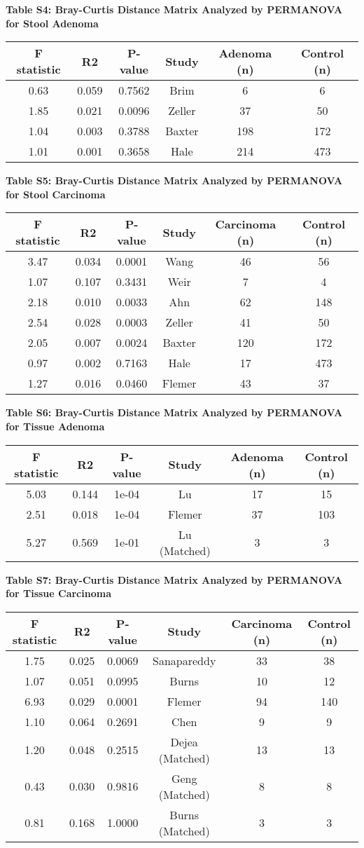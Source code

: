 \documentclass[12pt,]{article}
\begin{document}
\newpage

\textbf{Table S4: Bray-Curtis Distance Matrix Analyzed by PERMANOVA for
Stool Adenoma}

\begin{longtable}[]{@{}cccccc@{}}
\toprule
F statistic & R2 & P-value & Study & Adenoma (n) & Control
(n)\tabularnewline
\midrule
\endhead
0.63 & 0.059 & 0.7562 & Brim & 6 & 6\tabularnewline
1.85 & 0.021 & 0.0096 & Zeller & 37 & 50\tabularnewline
1.04 & 0.003 & 0.3788 & Baxter & 198 & 172\tabularnewline
1.01 & 0.001 & 0.3658 & Hale & 214 & 473\tabularnewline
\bottomrule
\end{longtable}

\newpage

\textbf{Table S5: Bray-Curtis Distance Matrix Analyzed by PERMANOVA for
Stool Carcinoma}

\begin{longtable}[]{@{}cccccc@{}}
\toprule
F statistic & R2 & P-value & Study & Carcinoma (n) & Control
(n)\tabularnewline
\midrule
\endhead
3.47 & 0.034 & 0.0001 & Wang & 46 & 56\tabularnewline
1.07 & 0.107 & 0.3431 & Weir & 7 & 4\tabularnewline
2.18 & 0.010 & 0.0033 & Ahn & 62 & 148\tabularnewline
2.54 & 0.028 & 0.0003 & Zeller & 41 & 50\tabularnewline
2.05 & 0.007 & 0.0024 & Baxter & 120 & 172\tabularnewline
0.97 & 0.002 & 0.7163 & Hale & 17 & 473\tabularnewline
1.27 & 0.016 & 0.0460 & Flemer & 43 & 37\tabularnewline
\bottomrule
\end{longtable}

\newpage

\textbf{Table S6: Bray-Curtis Distance Matrix Analyzed by PERMANOVA for
Tissue Adenoma}

\begin{longtable}[]{@{}cccccc@{}}
\toprule
F statistic & R2 & P-value & Study & Adenoma (n) & Control
(n)\tabularnewline
\midrule
\endhead
5.03 & 0.144 & 1e-04 & Lu & 17 & 15\tabularnewline
2.51 & 0.018 & 1e-04 & Flemer & 37 & 103\tabularnewline
5.27 & 0.569 & 1e-01 & Lu (Matched) & 3 & 3\tabularnewline
\bottomrule
\end{longtable}

\newpage

\textbf{Table S7: Bray-Curtis Distance Matrix Analyzed by PERMANOVA for
Tissue Carcinoma}

\begin{longtable}[]{@{}cccccc@{}}
\toprule
F statistic & R2 & P-value & Study & Carcinoma (n) & Control
(n)\tabularnewline
\midrule
\endhead
1.75 & 0.025 & 0.0069 & Sanapareddy & 33 & 38\tabularnewline
1.07 & 0.051 & 0.0995 & Burns & 10 & 12\tabularnewline
6.93 & 0.029 & 0.0001 & Flemer & 94 & 140\tabularnewline
1.10 & 0.064 & 0.2691 & Chen & 9 & 9\tabularnewline
1.20 & 0.048 & 0.2515 & Dejea (Matched) & 13 & 13\tabularnewline
0.43 & 0.030 & 0.9816 & Geng (Matched) & 8 & 8\tabularnewline
0.81 & 0.168 & 1.0000 & Burns (Matched) & 3 & 3\tabularnewline
\bottomrule
\end{longtable}
\end{document}
